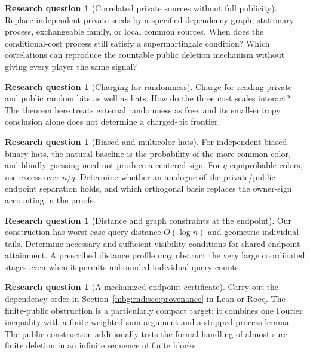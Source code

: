\documentclass[11pt,letterpaper]{article}
\theoremstyle{definition}
\newtheorem{question}[theorem]{Research question}
\begin{document}
\begin{question}[Correlated private sources without full publicity]
Replace independent private seeds by a specified dependency graph,
stationary process, exchangeable family, or local common sources.
When does the conditional-cost process still satisfy a supermartingale
condition? Which correlations can reproduce the countable public
deletion mechanism without giving every player the same signal?
\end{question}

\begin{question}[Charging for randomness]
Charge for reading private and public random bits as well as hats.
How do the three cost scales interact? The theorem here treats
external randomness as free, and its small-entropy conclusion alone
does not determine a charged-bit frontier.
\end{question}

\begin{question}[Biased and multicolor hats]
For independent biased binary hats, the natural baseline is the
probability of the more common color, and blindly guessing need not
produce a centered sign. For $q$ equiprobable colors, use excess over
$n/q$. Determine whether an analogue of the private/public endpoint
separation holds, and which orthogonal basis replaces the owner-sign
accounting in the proofs.
\end{question}

\begin{question}[Distance and graph constraints at the endpoint]
Our construction has worst-case query distance $O(\log n)$ and
geometric individual tails. Determine necessary and sufficient
visibility conditions for shared endpoint attainment. A prescribed
distance profile may obstruct the very large coordinated stages even
when it permits unbounded individual query counts.
\end{question}

\begin{question}[A mechanized endpoint certificate]
Carry out the dependency order in Section~\ref{mbg:rnd:sec:provenance} in Lean or
Rocq. The finite-public obstruction is a particularly compact target:
it combines one Fourier inequality with a finite weighted-sum argument
and a stopped-process lemma. The public construction additionally tests
the formal handling of almost-sure finite deletion in an infinite
sequence of finite blocks.
\end{question}
\end{document}
